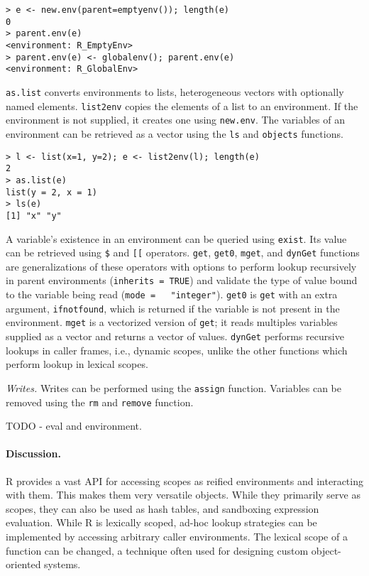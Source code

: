 \documentclass[10pt,review,sigplan,anonymous=true]{acmart}
\newcommand{\code}[1]{\lstinline |#1|\xspace}
\newcommand{\newEnv}{\code{new.env}}
\newcommand{\asList}{\code{as.list}}
\newcommand{\listToEnv}{\code{list2env}}
\newcommand{\ls}{\code{ls}}
\newcommand{\objects}{\code{objects}}
\newcommand{\subDollar}{\code{$}}
\newcommand{\subBracket}{\code{[[}}
\newcommand{\exist}{\code{exist}}
\newcommand{\get}{\code{get}}
\newcommand{\getZero}{\code{get0}}
\newcommand{\mget}{\code{mget}}
\newcommand{\dynGet}{\code{dynGet}}
\newcommand{\assign}{\code{assign}}
\newcommand{\remove}{\code{remove}}
\renewcommand{\rm}{\code{rm}}
\begin{document}
\begin{lstlisting}
> e <- new.env(parent=emptyenv()); length(e)
0
> parent.env(e)
<environment: R_EmptyEnv>
> parent.env(e) <- globalenv(); parent.env(e)
<environment: R_GlobalEnv>
\end{lstlisting}

\asList converts environments to lists, heterogeneous vectors with optionally
named elements. \listToEnv copies the elements of a list to an environment. If
the environment is not supplied, it creates one using \newEnv. The variables of
an environment can be retrieved as a vector using the \ls and \objects
functions.

\begin{lstlisting}
> l <- list(x=1, y=2); e <- list2env(l); length(e)
2
> as.list(e)
list(y = 2, x = 1)
> ls(e)
[1] "x" "y"
\end{lstlisting}

A variable's existence in an environment can be queried using \exist. Its value
can be retrieved using \subDollar and \subBracket operators. \get, \getZero,
\mget, and \dynGet functions are generalizations of these operators with options
to perform lookup recursively in parent environments (\code{inherits = TRUE})
and validate the type of value bound to the variable being read (\code{mode =
  "integer"}). \getZero is \get with an extra argument, \code{ifnotfound}, which
is returned if the variable is not present in the environment. \mget is a
vectorized version of \get; it reads multiples variables supplied as a vector
and returns a vector of values. \dynGet performs recursive lookups in caller
frames, i.e., dynamic scopes, unlike the other functions which perform lookup in
lexical scopes.

\textit{Writes.} Writes can be performed using the \assign function. Variables
can be removed using the \rm and \remove function.

TODO - eval and environment.

\paragraph{Discussion.} R provides a vast API for accessing scopes as reified
environments and interacting with them. This makes them very versatile objects.
While they primarily serve as scopes, they can also be used as hash tables, and
sandboxing expression evaluation. While R is lexically scoped, ad-hoc lookup
strategies can be implemented by accessing arbitrary caller environments. The
lexical scope of a function can be changed, a technique often used for designing
custom object-oriented systems.
\end{document}
